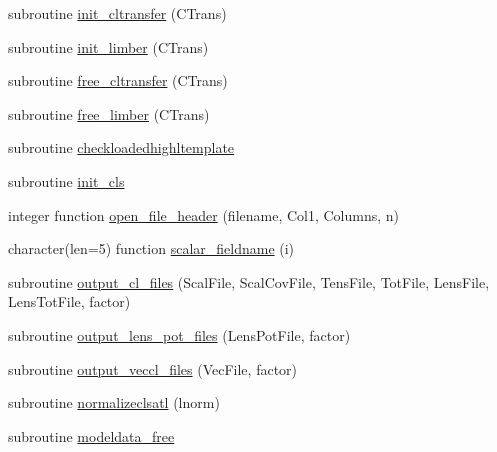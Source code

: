 \begin{DoxyCompactItemize}
\item 
subroutine \mbox{\hyperlink{namespacemodeldata_aafb7870d44b0d4146bad72673d70223f}{init\+\_\+cltransfer}} (C\+Trans)
\item 
subroutine \mbox{\hyperlink{namespacemodeldata_af9818c2b8e3f5e17f6d1a309726fc12e}{init\+\_\+limber}} (C\+Trans)
\item 
subroutine \mbox{\hyperlink{namespacemodeldata_a2d6ecb98a3edf71d3e3ed3ee1ffb82d1}{free\+\_\+cltransfer}} (C\+Trans)
\item 
subroutine \mbox{\hyperlink{namespacemodeldata_a89ab0d30547c35685982ecf01d7145bd}{free\+\_\+limber}} (C\+Trans)
\item 
subroutine \mbox{\hyperlink{namespacemodeldata_a031eb48cced394c893960d706797a651}{checkloadedhighltemplate}}
\item 
subroutine \mbox{\hyperlink{namespacemodeldata_a3b4fcde7e9343acbea6dd3d7b52aba10}{init\+\_\+cls}}
\item 
integer function \mbox{\hyperlink{namespacemodeldata_abab5acd24b50e4d884e84682fed17a52}{open\+\_\+file\+\_\+header}} (filename, Col1, Columns, n)
\item 
character(len=5) function \mbox{\hyperlink{namespacemodeldata_af3439e8b84f5875f131343636aa8adee}{scalar\+\_\+fieldname}} (i)
\item 
subroutine \mbox{\hyperlink{namespacemodeldata_ace30b2a5cf368aaadfbdaf70dcc20a9e}{output\+\_\+cl\+\_\+files}} (Scal\+File, Scal\+Cov\+File, Tens\+File, Tot\+File, Lens\+File, Lens\+Tot\+File, factor)
\item 
subroutine \mbox{\hyperlink{namespacemodeldata_a3db0a7cfe521f110aeef7aaa900d1843}{output\+\_\+lens\+\_\+pot\+\_\+files}} (Lens\+Pot\+File, factor)
\item 
subroutine \mbox{\hyperlink{namespacemodeldata_a307b673f582637ddd1d7c8557429e040}{output\+\_\+veccl\+\_\+files}} (Vec\+File, factor)
\item 
subroutine \mbox{\hyperlink{namespacemodeldata_aec1c8c9bdd2a65d1f5eec6cb91f7afa1}{normalizeclsatl}} (lnorm)
\item 
subroutine \mbox{\hyperlink{namespacemodeldata_a4a66d258c52f2b7639e92ce04f7047ff}{modeldata\+\_\+free}}
\end{DoxyCompactItemize}

